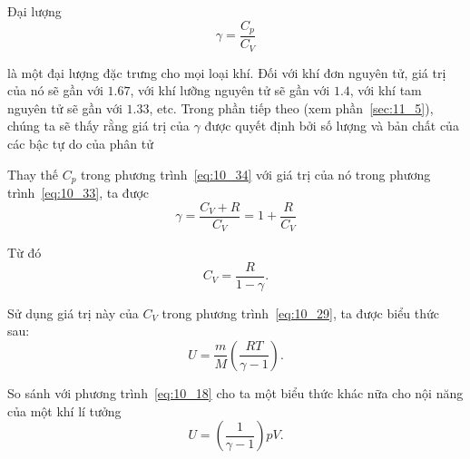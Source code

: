 Đại lượng
\begin{equation}\label{eq:10_34}
	\gamma = \frac{C_p}{C_V}
\end{equation}

\noindent

là một đại lượng đặc trưng cho mọi loại khí. Đối với khí đơn nguyên tử, giá trị của nó sẽ gần với $1.67$, với khí lưỡng nguyên tử sẽ gần với $1.4$, với khí tam nguyên tử sẽ gần với $1.33$, etc. Trong phần tiếp theo (xem phần~\ref{sec:11_5}), chúng ta sẽ thấy rằng giá trị của $\gamma$ được quyết định bởi số lượng và bản chất của các bậc tự do của phân tử


Thay thế $C_p$ trong phương trình~\eqref{eq:10_34} với giá trị của nó trong phương trình~\eqref{eq:10_33}, ta được 
\begin{equation*}
	\gamma = \frac{C_V + R}{C_V} = 1 + \frac{R}{C_V}
\end{equation*}

\noindent

Từ đó
\begin{equation}\label{eq:10_35}
	C_V = \frac{R}{1 - \gamma}.
\end{equation}

\noindent

Sử dụng giá trị này của $C_V$ trong phương trình~\eqref{eq:10_29}, ta được biểu thức sau:
\begin{equation}\label{eq:10_36}
	U = \frac{m}{M}\left(\frac{RT}{\gamma - 1}\right).
\end{equation}

\noindent

So sánh với phương trình~\eqref{eq:10_18} cho ta một biểu thức khác nữa cho nội năng của một khí lí tưởng
\begin{equation}\label{eq:10_37}
	U = \left(\frac{1}{\gamma - 1}\right) pV.
\end{equation}


